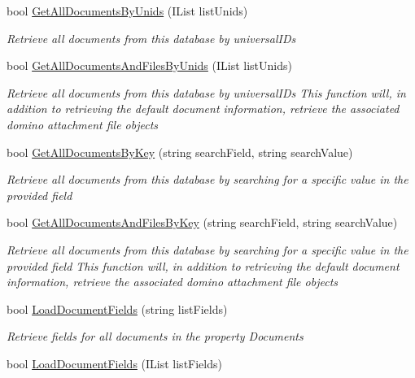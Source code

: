 \begin{DoxyCompactItemize}
bool \mbox{\hyperlink{class_database_object_a92e80ea30e83cddf47f29d0f502b81c5}{Get\+All\+Documents\+By\+Unids}} (I\+List list\+Unids)
\begin{DoxyCompactList}\small\item\em Retrieve all documents from this database by universal\+I\+Ds \end{DoxyCompactList}\item 
bool \mbox{\hyperlink{class_database_object_aa69262a50977a28a2decf400d1eedd20}{Get\+All\+Documents\+And\+Files\+By\+Unids}} (I\+List list\+Unids)
\begin{DoxyCompactList}\small\item\em Retrieve all documents from this database by universal\+I\+Ds This function will, in addition to retrieving the default document information, retrieve the associated domino attachment file objects \end{DoxyCompactList}\item 
bool \mbox{\hyperlink{class_database_object_ad4834e7677cd0418969a657eed99653c}{Get\+All\+Documents\+By\+Key}} (string search\+Field, string search\+Value)
\begin{DoxyCompactList}\small\item\em Retrieve all documents from this database by searching for a specific value in the provided field \end{DoxyCompactList}\item 
bool \mbox{\hyperlink{class_database_object_a6c2fb05fb6972d74d5bea67e323985fb}{Get\+All\+Documents\+And\+Files\+By\+Key}} (string search\+Field, string search\+Value)
\begin{DoxyCompactList}\small\item\em Retrieve all documents from this database by searching for a specific value in the provided field This function will, in addition to retrieving the default document information, retrieve the associated domino attachment file objects \end{DoxyCompactList}\item 
bool \mbox{\hyperlink{class_database_object_a88ae0bcda671009e2742858ab945a18c}{Load\+Document\+Fields}} (string list\+Fields)
\begin{DoxyCompactList}\small\item\em Retrieve fields for all documents in the property \textquotesingle{}Documents\textquotesingle{} \end{DoxyCompactList}\item 
bool \mbox{\hyperlink{class_database_object_a8a64b91e2e4228b2fc552e51959987c4}{Load\+Document\+Fields}} (I\+List list\+Fields)

\end{DoxyCompactItemize}
